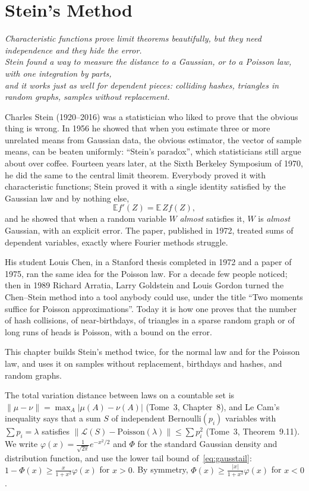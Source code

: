 \chapter{Stein's Method}
\begin{center}\itshape
Characteristic functions prove limit theorems beautifully, but they need independence and they hide the error.\\
Stein found a way to measure the distance to a Gaussian, or to a Poisson law, with one integration by parts,\\
and it works just as well for dependent pieces: colliding hashes, triangles in random graphs, samples without replacement.
\end{center}

Charles Stein (1920--2016) was a statistician who liked to prove that the obvious thing is wrong. In 1956 he showed that when you estimate three or more
unrelated means from Gaussian data, the obvious estimator, the vector of sample means, can be beaten uniformly: ``Stein's paradox'', which statisticians
still argue about over coffee. Fourteen years later, at the Sixth Berkeley Symposium of 1970, he did the same to the central limit theorem. Everybody
proved it with characteristic functions; Stein proved it with a single identity satisfied by the Gaussian law and by nothing else,
\[
\mathbb E f'(Z)=\mathbb E\,Zf(Z),
\]
and he showed that when a random variable $W$ \emph{almost} satisfies it, $W$ is \emph{almost} Gaussian, with an explicit error. The paper, published in 1972,
treated sums of dependent variables, exactly where Fourier methods struggle.

His student Louis Chen, in a Stanford thesis completed in 1972 and a paper of 1975, ran the same idea for the Poisson law. For a decade few people
noticed; then in 1989 Richard Arratia, Larry Goldstein and Louis Gordon turned the Chen--Stein method into a tool anybody could use, under the title
``Two moments suffice for Poisson approximations''. Today it is how one proves that the number of hash collisions, of near-birthdays, of triangles in a
sparse random graph or of long runs of heads is Poisson, with a bound on the error.

This chapter builds Stein's method twice, for the normal law and for the Poisson law, and uses it on samples without replacement, birthdays and
hashes, and random graphs.

\begin{reminder}
The total variation distance between laws on a countable set is $\|\mu-\nu\|=\max_A|\mu(A)-\nu(A)|$ (Tome~3, Chapter~8), and Le Cam's inequality says that a
sum $S$ of independent Bernoulli$(p_i)$ variables with $\sum p_i=\lambda$ satisfies $\|\mathcal L(S)-\text{Poisson}(\lambda)\|\le\sum p_i^2$ (Tome~3, Theorem~9.11).
We write $\varphi(x)=\frac1{\sqrt{2\pi}}e^{-x^2/2}$ and $\Phi$ for the standard Gaussian density and distribution function, and use the lower tail bound
of~\eqref{eq:gausstail}: $1-\Phi(x)\ge\frac x{1+x^2}\varphi(x)$ for $x>0$. By symmetry, $\Phi(x)\ge\frac{|x|}{1+x^2}\varphi(x)$ for $x<0$.
\end{reminder}

